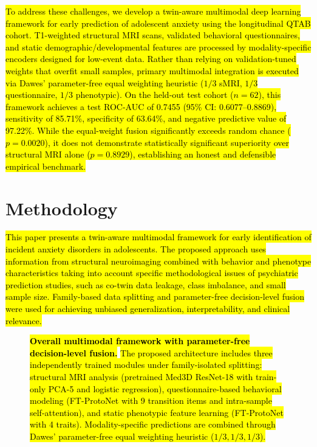 \documentclass[10pt,letterpaper]{article}
\begin{document}
\hl{To address these challenges, we develop a twin-aware multimodal deep learning framework for early prediction of adolescent anxiety using the longitudinal QTAB cohort. T1-weighted structural MRI scans, validated behavioral questionnaires, and static demographic/developmental features are processed by modality-specific encoders designed for low-event data. Rather than relying on validation-tuned weights that overfit small samples, primary multimodal integration is executed via Dawes' parameter-free equal weighting heuristic ($1/3$ sMRI, $1/3$ questionnaire, $1/3$ phenotypic). On the held-out test cohort ($n=62$), this framework achieves a test ROC-AUC of 0.7455 (95\% CI: 0.6077--0.8869), sensitivity of 85.71\%, specificity of 63.64\%, and negative predictive value of 97.22\%. While the equal-weight fusion significantly exceeds random chance ($p = 0.0020$), it does not demonstrate statistically significant superiority over structural MRI alone ($p = 0.8929$), establishing an honest and defensible empirical benchmark.}

        \section*{Methodology}

        \hl{This paper presents a twin-aware multimodal framework for early identification of incident anxiety disorders in adolescents. The proposed approach uses information from structural neuroimaging combined with behavior and phenotype characteristics taking into account specific methodological issues of psychiatric prediction studies, such as co-twin data leakage, class imbalance, and small sample size. Family-based data splitting and parameter-free decision-level fusion were used for achieving unbiased generalization, interpretability, and clinical relevance.}

        \begin{figure}[!h]
        \caption{\hl{\textbf{Overall multimodal framework with parameter-free decision-level fusion.}}
        \hl{The proposed architecture includes three independently trained modules under family-isolated splitting: structural MRI analysis (pretrained Med3D ResNet-18 with train-only PCA-5 and logistic regression), questionnaire-based behavioral modeling (FT-ProtoNet with 9 transition items and intra-sample self-attention), and static phenotypic feature learning (FT-ProtoNet with 4 traits). Modality-specific predictions are combined through Dawes' parameter-free equal weighting heuristic ($1/3, 1/3, 1/3$).}}
        \label{fig:main}
        \end{figure}
\end{document}
